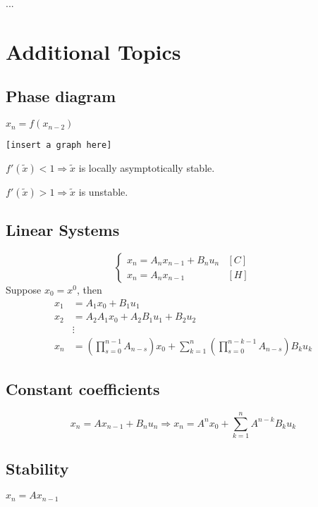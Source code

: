 \documentclass[twoside]{article}
\newcommand\lb{\left (}
\newcommand\rb{\right )}
\begin{document}
\begin{theorem}[Shur]
    ...
\end{theorem}

\section{Additional Topics}
\subsection*{Phase diagram}
$x_{n} = f(x_{n-2})$
\begin{center}
    \texttt{[insert a graph here]}
\end{center}

\begin{remark}
    $f'(\tilde{x}) < 1 \Longrightarrow \tilde{x}$ is locally asymptotically stable.

    $f'(\tilde{x}) > 1 \Longrightarrow \tilde{x}$ is unstable.    
\end{remark}

\subsection*{Linear Systems}
\[
\begin{cases}
    x_n = A_n x_{n-1} + B_{n} u_{n} & [C]\\
    x_n = A_n x_{n-1} & [H]    
\end{cases}
\]
Suppose $x_{0} = x^{0}$, then \[
\begin{aligned}
    x_{1} &= A_{1} x_{0} + B_1 u_1\\
    x_{2} &= A_{2} A_{1}x_{0} + A_{2} B_{1} u_{1} + B_{2} u_{2}\\
    &\vdots\\
    x_{n} &= \lb \prod_{s=0}^{n-1} A_{n-s} \rb x_{0} + \sum_{k=1}^{n}(\prod_{s=0}^{n-k-1} A_{n-s})B_{k} u_{k}
\end{aligned}
\]

\subsection*{Constant coefficients}
\[
    x_n = A x_{n-1} + B_{n} u_{n}  \Longrightarrow x_{n} = A^{n}x_{0} + \sum_{k=1}^{n}A^{n-k}B_{k}u_{k}
\]

\subsection*{Stability}
$x_{n} = A x_{n-1}$
\end{document}
